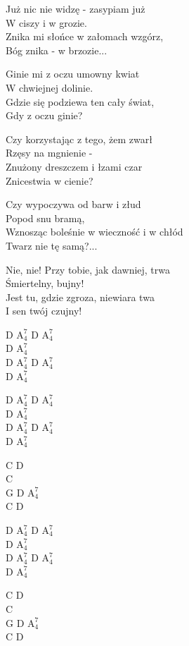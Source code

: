\begin{textn}
    Już nic nie widzę - zasypiam już\\
    W ciszy i w grozie.\\
    Znika mi słońce w załomach wzgórz,\\
    Bóg znika - w brzozie...

    Ginie mi z oczu umowny kwiat\\
    W chwiejnej dolinie.\\
    Gdzie się podziewa ten cały świat,\\
    Gdy z oczu ginie?

    Czy korzystając z tego, żem zwarł\\
    Rzęsy na mgnienie -\\
    Znużony dreszczem i łzami czar\\
    Znicestwia w cienie?

    Czy wypoczywa od barw i złud\\
    Popod snu bramą,\\
    Wznosząc boleśnie w wieczność i w chłód\\
    Twarz nie tę samą?...

    Nie, nie! Przy tobie, jak dawniej, trwa\\
    Śmiertelny, bujny!\\
    Jest tu, gdzie zgroza, niewiara twa\\
    I sen twój czujny!
\end{textn}
\begin{chordw}
    D $\mathrm{A_{4}^{7}}$ D $\mathrm{A_{4}^{7}}$\\
    D $\mathrm{A_{4}^{7}}$\\
    D $\mathrm{A_{4}^{7}}$ D $\mathrm{A_{4}^{7}}$\\
    D $\mathrm{A_{4}^{7}}$

    D $\mathrm{A_{4}^{7}}$ D $\mathrm{A_{4}^{7}}$\\
    D $\mathrm{A_{4}^{7}}$\\
    D $\mathrm{A_{4}^{7}}$ D $\mathrm{A_{4}^{7}}$\\
    D $\mathrm{A_{4}^{7}}$

    C D\\
    C\\
    G D $\mathrm{A_{4}^{7}}$\\
    C D

    D $\mathrm{A_{4}^{7}}$ D $\mathrm{A_{4}^{7}}$\\
    D $\mathrm{A_{4}^{7}}$\\
    D $\mathrm{A_{4}^{7}}$ D $\mathrm{A_{4}^{7}}$\\
    D $\mathrm{A_{4}^{7}}$

    C D\\
    C\\
    G D $\mathrm{A_{4}^{7}}$\\
    C D
\end{chordw}
